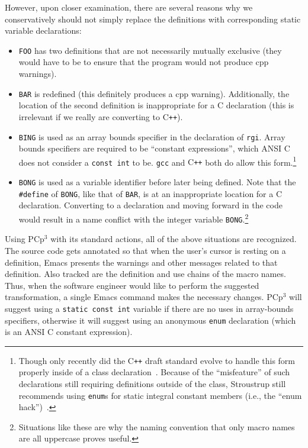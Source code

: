 \documentclass{article}
\newcommand{\pcp}{\mbox{\textsf{PCp}$^3$}}
\newcommand{\Cpp}{\mbox{\textsf{cpp}}}
\newcommand{\CPP}{\mbox{\textsf{C\texttt{++}}}}
\newcommand{\C}{\mbox{\textsf{C}}}
\newcommand{\ppd}[1]{\texttt{\##1}}
\newcommand{\ie}{i.e.,}
\begin{document}
However, upon closer examination, there are several reasons why we
conservatively should not simply replace the definitions with
corresponding static variable declarations:

\begin{itemize}
\item \texttt{FOO} has two definitions that are not necessarily mutually
      exclusive (they would have to be to ensure that the program would
      not produce \Cpp{} warnings).
\item \texttt{BAR} is redefined (this definitely produces a \Cpp{}
      warning).  Additionally, the location of the second definition is
      inappropriate for a \C{} declaration (this is irrelevant if we
      really are converting to \CPP{}).
\item \texttt{BING} is used as an array bounds specifier in the
      declaration of \texttt{rgi}.  Array bounds specifiers are required
      to be ``constant expressions'', which ANSI \C{} does not consider
      a \texttt{const int} to be.  \texttt{gcc} and \CPP{} both do allow
      this form.\footnote{Though only recently did the \CPP{} draft standard
      evolve to handle this form properly inside of a class
      declaration~\cite{CD2DraftStandard}.  Because of the
      ``misfeature'' of such declarations still requiring definitions
      outside of the class, Stroustrup still recommends using
      \texttt{enum}s for static integral constant members (\ie{} the
      ``enum hack'')~\cite[p.~249]{Stroustrup97}.}
\item \texttt{BONG} is used as a variable identifier before later being
      defined.  Note that the \ppd{define} of \texttt{BONG}, like that
      of \texttt{BAR}, is at an inappropriate location for a \C{}
      declaration.  Converting to a declaration and moving forward in
      the code would result in a name conflict with the integer variable
      \texttt{BONG}.\footnote{Situations like these are why the naming
      convention that only macro names are all uppercase proves useful.}
\end{itemize}

\noindent Using \pcp{} with its standard actions, all of the above
situations are recognized.  The source code gets annotated so that when
the user's cursor is resting on a definition, Emacs presents the
warnings and other messages related to that definition.  Also tracked
are the definition and use chains of the macro names.  Thus, when the
software engineer would like to perform the suggested transformation, a
single Emacs command makes the necessary changes.  \pcp{} will suggest
using a \texttt{static const int} variable if there are no uses in
array-bounds specifiers, otherwise it will suggest using an anonymous
\texttt{enum} declaration (which is an ANSI \C{} constant expression).
\end{document}
